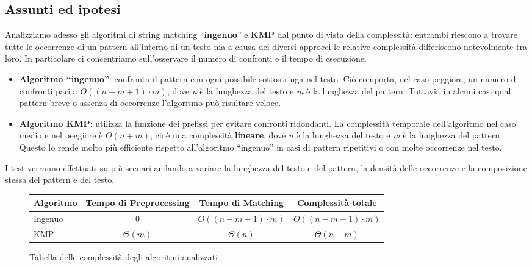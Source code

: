 \documentclass{article}
\begin{document}
\subsection{Assunti ed ipotesi}
Analizziamo adesso gli algoritmi di string matching ``\textbf{ingenuo}'' e \textbf{KMP} dal punto di vista della complessità: entrambi riescono a trovare tutte le occorrenze di un pattern all'interno di un testo ma a causa dei diversi approcci le relative complessità differiscono notevolmente tra loro. In particolare ci concentriamo sull'osservare il numero di confronti e il tempo di esecuzione.
\begin{itemize}
    \item \textbf{Algoritmo ``ingenuo''}: confronta il pattern con ogni possibile sottostringa nel testo. Ciò comporta, nel caso peggiore, un numero di confronti pari a $O((n - m + 1) \cdot m)$, dove \textit{n} è la lunghezza del testo e \textit{m} è la lunghezza del pattern. Tuttavia in alcuni casi quali pattern breve o assenza di occorrenze l'algoritmo può risultare veloce.
    \item \textbf{Algoritmo KMP}: utilizza la funzione dei prefissi per evitare confronti ridondanti. La complessità temporale dell'algoritmo nel caso medio e nel peggiore è $\Theta(n + m)$, cioè una complessità \textbf{lineare}, dove \textit{n} è la lunghezza del testo e \textit{m} è la lunghezza del pattern. Questo lo rende molto più efficiente rispetto all'algoritmo ``ingenuo'' in casi di pattern ripetitivi o con molte occorrenze nel testo.
\end{itemize}
I test verranno effettuati su più scenari andando a variare la lunghezza del testo e del pattern, la densità delle occorrenze e la composizione stessa del pattern e del testo.
\begin{figure}[H]
    \begin{table}[H]
        \centering
        \begin{tabular}{>{\raggedright\arraybackslash}p{2cm}ccc}
            Algoritmo & Tempo di Preprocessing & Tempo di Matching        & Complessità totale       \\
            \midrule
            Ingenuo   & 0                      & $O((n - m + 1) \cdot m)$ & $O((n - m + 1) \cdot m)$ \\
            KMP       & $\Theta(m)$            & $\Theta(n)$              & $\Theta(n + m)$          \\
        \end{tabular}
    \end{table}
    \caption{Tabella delle complessità degli algoritmi analizzati}
    \label{tab:complexity-table}
\end{figure}
\end{document}
